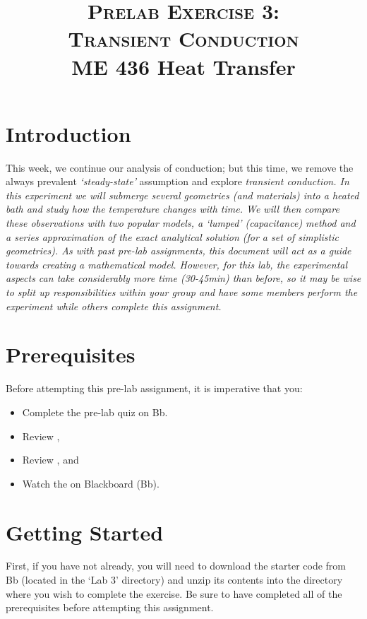 \documentclass[11pt, letterpaper]{article}
\title{ \textsc{Prelab Exercise 3: \\ Transient Conduction} \\ {\large  \color{darkgray} ME 436 Heat Transfer}}
\begin{document}
\date{}
\maketitle
\thispagestyle{firstpage} 




\section*{Introduction}

This week, we continue our analysis of conduction; but this time, we remove the always prevalent \textit{`steady-state'} assumption and explore \it{transient conduction}. In this experiment we will submerge several geometries (and materials) into a heated \it{bath} and study how the temperature changes with time. We will then compare these observations with two popular models, a \it{`lumped'} (capacitance) method and a series approximation of the exact analytical solution (for a set of simplistic geometries).
\n
As with past pre-lab assignments, this document will act as a guide towards creating a mathematical model. However, for this lab, the experimental aspects can take considerably more time (30-45min) than before, so it may be wise to split up responsibilities within your group and have some members perform the experiment while others complete this assignment.

\section*{Prerequisites}
Before attempting this pre-lab assignment, it is imperative that you:
{\small
\begin{itemize}
    \item Complete the pre-lab quiz on Bb.
    \item Review ,
    \item Review , and
    \item Watch the  on Blackboard (Bb).
\end{itemize}
}

\section*{Getting Started}
First, if you have not already, you will need to download the starter code from Bb (located in the `Lab 3' directory) and unzip its contents into the directory where you wish to complete the exercise. Be sure to have completed all of the prerequisites before attempting this assignment.
\end{document}
